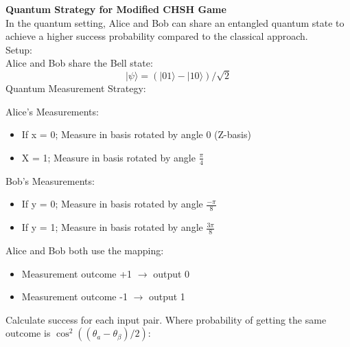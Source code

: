 \documentclass[12pt]{article}
\begin{document}
\textbf{Quantum Strategy for Modified CHSH Game}
\\
In the quantum setting, Alice and Bob can share an entangled quantum state to achieve a higher success probability compared to the classical approach.
\\
Setup:
\\
Alice and Bob share the Bell state:
\[
    |\psi\rangle = (|01\rangle - |10\rangle)/ \sqrt{2}
\]
Quantum Measurement Strategy:

Alice's Measurements:
\begin{itemize}
    \item If x = 0; Measure in basis rotated by angle 0 (Z-basis)
    \item X = 1; Measure in basis rotated by angle $\frac{\pi}{4}$
\end{itemize}
Bob's Measurements:
\begin{itemize}
    \item If y = 0; Measure in basis rotated by angle $\frac{-\pi}{8}$
    \item If y = 1; Measure in basis rotated by angle $\frac{3\pi}{8}$
\end{itemize}
Alice and Bob both use the mapping:
\begin{itemize}
    \item Measurement outcome +1 $\rightarrow$ output 0
    \item Measurement outcome -1 $\rightarrow$ output 1
\end{itemize}

Calculate success for each input pair. Where probability of getting the same outcome is $\cos^{2}((\theta_a - \theta_\beta )/2)$:
\end{document}
